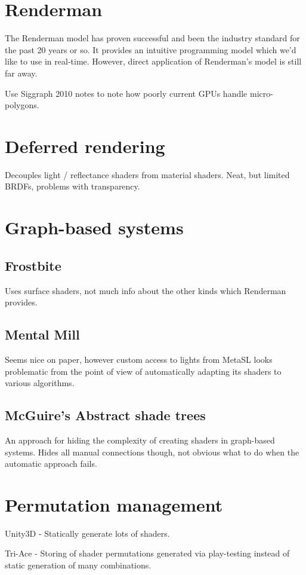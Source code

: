 \section{Renderman}

The Renderman model has proven successful and been the industry standard for the past 20 years or so. It provides an intuitive programming model which we'd like to use in real-time. However, direct application of Renderman's model is still far away.

Use Siggraph 2010 notes to note how poorly current GPUs handle micro-polygons.

\section{Deferred rendering}

Decouples light / reflectance shaders from material shaders. Neat, but limited BRDFs, problems with transparency.

\section{Graph-based systems}
\subsection{Frostbite}

Uses surface shaders, not much info about the other kinds which Renderman provides.

\subsection{Mental Mill}

Seems nice on paper, however custom access to lights from MetaSL looks problematic from the point of view of automatically adapting its shaders to various algorithms.

\subsection{McGuire's Abstract shade trees}

An approach for hiding the complexity of creating shaders in graph-based systems. Hides all manual connections though, not obvious what to do when the automatic approach fails.

\section{Permutation management}

Unity3D - Statically generate lots of shaders.

Tri-Ace - Storing of shader permutations generated via play-testing instead of static generation of many combinations.
